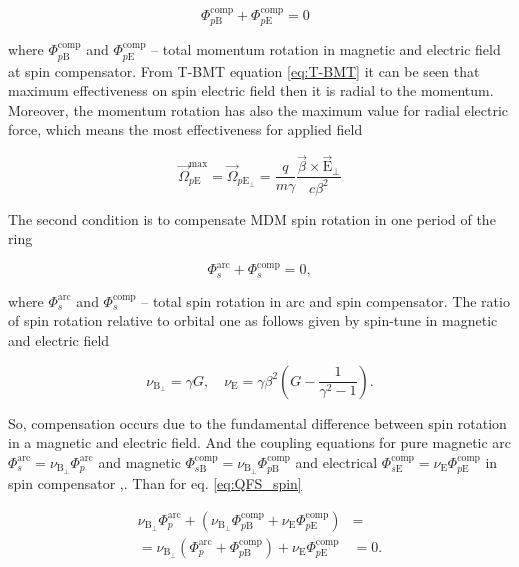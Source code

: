 \documentclass[submitting]{nst}
\begin{document}
\begin{equation}
	\Phi_{p\textrm{B}}^{\textrm{comp}}+{\Phi}_{p\textrm{E}}^{\textrm{comp}} = 0\ \ \ 
\end{equation}

\noindent where $\Phi_{p\textrm{B}}^{\textrm{comp}}$ and ${\Phi}_{p\textrm{E}}^{\textrm{comp}}$ -- total momentum rotation in magnetic and electric field at spin compensator. From T-BMT equation \ref{eq:T-BMT} it can be seen that maximum effectiveness on spin electric field then it is radial to the momentum. Moreover, the momentum rotation has also the maximum value for radial electric force, which means the most effectiveness for applied field

\begin{equation}
	\vec{\Omega}_{p\mathrm{E}}^{\text{max}} = \vec{\Omega}_{p\mathrm{E}_{\perp}}=\frac{q}{m \gamma} \frac{\vec{\beta} \times \vec{\mathrm{E}}_{\perp}}{c \beta^2}
\end{equation}

\par The second condition is to compensate MDM spin rotation in one period of the ring 

\begin{equation}
	\Phi_s^{\textrm{arc}}+\Phi_{s}^{\textrm{comp}}=0,
	\label{eq:QFS_spin}
\end{equation}

\noindent where $\Phi_s^{\textrm{arc}}$ and $\Phi_{s}^{\textrm{comp}}$ -- total spin rotation in arc and spin compensator. The ratio of spin rotation relative to orbital one as follows given by spin-tune in magnetic and electric field

\begin{equation}
	\nu_{\mathrm{B}_{\perp}} = \gamma G, \quad \nu_{\mathrm{E}} = \gamma \beta^2 \left(G-\frac{1}{\gamma^{2}-1}\right).
	\label{eq:spin-tine}
\end{equation} 

 \noindent So, compensation occurs due to the fundamental difference between spin rotation in a magnetic and electric field. And the coupling equations for pure magnetic arc $\Phi_{s}^{\text{arc}} = \nu_{\mathrm{B}_{\perp}}\Phi_{p}^{\text{arc}}$ and magnetic $\Phi_{s\mathrm{B}}^{\text{comp}} = \nu_{\mathrm{B}_{\perp}}\Phi_{p\mathrm{B}}^{\text{comp}}$ and electrical $\Phi_{s\mathrm{E}}^{\text{comp}} = \nu_{\mathrm{E}}\Phi_{p\mathrm{E}}^{\text{comp}}$ in spin compensator ,. Than for eq. \ref{eq:QFS_spin}
 
 \begin{equation}
 	\begin{aligned}
 	\nu_{\mathrm{B}_{\perp}}\Phi_{p}^{\text{arc}} +
 	\left(\nu_{\mathrm{B}_{\perp}}\Phi_{p\mathrm{B}}^{\text{comp}} +
 	\nu_{\mathrm{E}}\Phi_{p\mathrm{E}}^{\text{comp}} \right) & = \\
 	= \nu_{\mathrm{B}_{\perp}} \left( 
 	\Phi_{p}^{\text{arc}} +
 	\Phi_{p\mathrm{B}}^{\text{comp}} \right) +
 	\nu_{\mathrm{E}}\Phi_{p\mathrm{E}}^{\text{comp}}  & = 0.
 	\label{eq:deflection}
 	\end{aligned}
 \end{equation}
  
\end{document}
